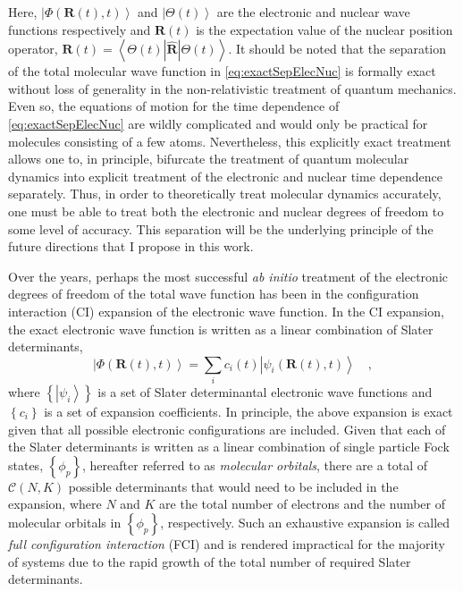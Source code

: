 \documentclass[12pt]{article}
\newcommand{\ket}[1]{\left\vert #1 \right\rangle}         %
\newcommand{\innerop}[3]{\left\langle #1 \left\vert #2 \right\vert #3 \right\rangle}  %
\newcommand*\vc[1]{\boldsymbol{#1}}
\begin{document}
Here, $\ket{\Phi(\vc{R}(t),t)}$ and $\ket{\Theta (t)}$ are the electronic and
nuclear wave functions respectively and $\vc{R}(t)$ is the expectation value of
the nuclear position operator, $\vc{R}(t) =
\innerop{\Theta(t)}{\hat{\vc{R}}}{\Theta(t)}$.  It should be noted that the
separation of the total molecular wave function in \cref{eq:exactSepElecNuc} is
formally exact\cite{Gross10_PRL123002, Cederbaum08_JCP124101} without loss of
generality in the non-relativistic treatment of quantum mechanics. Even so, the
equations of motion for the time dependence of \cref{eq:exactSepElecNuc} are
wildly complicated\cite{Ghosh15_MP1} and would only be practical for molecules
consisting of a few atoms.  Nevertheless, this explicitly exact treatment allows
one to, in principle, bifurcate the treatment of quantum molecular dynamics into
explicit treatment of the electronic and nuclear time dependence separately.
Thus, in order to theoretically treat molecular dynamics accurately, one must be
able to treat both the electronic and nuclear degrees of freedom to some level
of accuracy.  This separation will be the underlying principle of the future
directions that I propose in this work.

Over the years, perhaps the most successful \emph{ab initio} treatment of the
electronic degrees of freedom of the total wave function has been in the
configuration interaction (CI) expansion of the electronic wave function. In the
CI expansion, the exact electronic wave function is written as a linear
combination of Slater determinants,
\begin{equation}
\ket{\Phi (\vc{R}(t),t)} = \sum_i c_i(t) \ket{\psi_i (\vc{R}(t),t)}
\quad ,
\label{eq:CIExp}
\end{equation}
where $\left\lbrace\ket{\psi_i}\right\rbrace$ is a set of Slater determinantal
electronic wave functions and $\left\lbrace c_i \right\rbrace$ is a set of
expansion coefficients.  In principle, the above expansion is exact given that
all possible electronic configurations are included. Given that each of the
Slater determinants is written as a linear combination of single particle Fock
states, $\left\lbrace \phi_p \right\rbrace$, hereafter referred to as
\emph{molecular orbitals}, there are a total of $\mathcal{C}(N,K)$ possible
determinants that would need to be included in the expansion, where $N$ and $K$
are the total number of electrons and the number of molecular orbitals in
$\left\lbrace \phi_p \right\rbrace$, respectively. Such an exhaustive expansion
is called \emph{full configuration interaction} (FCI) and is rendered
impractical for the majority of systems due to the rapid growth of the total
number of required Slater determinants.
\end{document}
